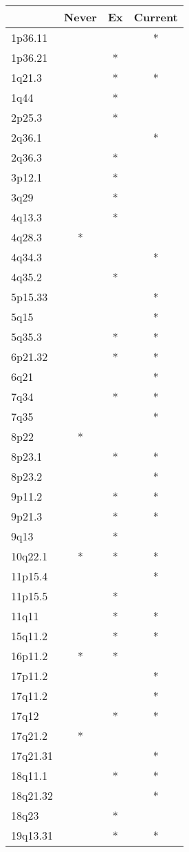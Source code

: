 \begin{tabular}{lccc}
\toprule
{} & Never & Ex & Current \\
\midrule
1p36.11  &       &    &       * \\
1p36.21  &       &  * &         \\
1q21.3   &       &  * &       * \\
1q44     &       &  * &         \\
2p25.3   &       &  * &         \\
2q36.1   &       &    &       * \\
2q36.3   &       &  * &         \\
3p12.1   &       &  * &         \\
3q29     &       &  * &         \\
4q13.3   &       &  * &         \\
4q28.3   &     * &    &         \\
4q34.3   &       &    &       * \\
4q35.2   &       &  * &         \\
5p15.33  &       &    &       * \\
5q15     &       &    &       * \\
5q35.3   &       &  * &       * \\
6p21.32  &       &  * &       * \\
6q21     &       &    &       * \\
7q34     &       &  * &       * \\
7q35     &       &    &       * \\
8p22     &     * &    &         \\
8p23.1   &       &  * &       * \\
8p23.2   &       &    &       * \\
9p11.2   &       &  * &       * \\
9p21.3   &       &  * &       * \\
9q13     &       &  * &         \\
10q22.1  &     * &  * &       * \\
11p15.4  &       &    &       * \\
11p15.5  &       &  * &         \\
11q11    &       &  * &       * \\
15q11.2  &       &  * &       * \\
16p11.2  &     * &  * &         \\
17p11.2  &       &    &       * \\
17q11.2  &       &    &       * \\
17q12    &       &  * &       * \\
17q21.2  &     * &    &         \\
17q21.31 &       &    &       * \\
18q11.1  &       &  * &       * \\
18q21.32 &       &    &       * \\
18q23    &       &  * &         \\
19q13.31 &       &  * &       * \\
\bottomrule
\end{tabular}
